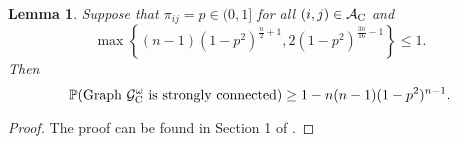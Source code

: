 \documentclass[a4paper,10pt]{article}
\newcommand{\A}{\mathcal{A}}
\theoremstyle{plain}
\newtheorem{lemma}[theorem]{Lemma}
\newcommand{\revv}[1]{{#1}}
\begin{document}
{		\begin{lemma}\label{theorem: strongLB}
			Suppose that $\pi_{ij} = p \in (0,1]$ for all $(i,j) \in \A_{\rm{C}}$ and 
			\begin{equation}\label{assumptionSCC}
				\max\left\{(n-1)(1-p^2)^{\frac{n}{2}+1}, 2(1-p^2)^{\frac{3n}{16}-1}\right\} \leq 1.
			\end{equation}
			Then 
			\begin{equation}\label{ERlimproperty_equation}
				\mathbb{P}(\text{Graph}~\mathcal{G}_{\rm{C}}^\omega\text{ is strongly connected}) \geq 1 - n(n-1)(1-p^2)^{n-1}.
			\end{equation}
		\end{lemma}
		\begin{proof}
			The proof can be found in \revv{Section} 1 of \cite{Chen2022}.
		\end{proof}
		
}
\end{document}
